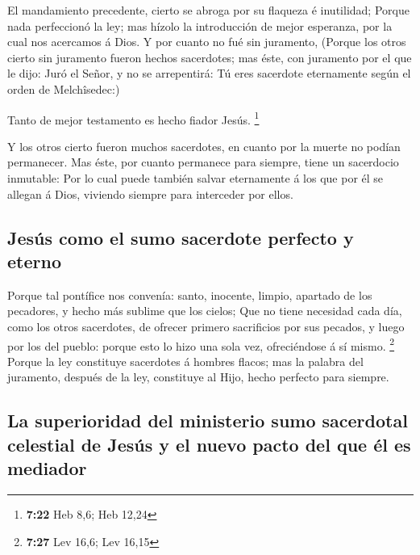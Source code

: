 El mandamiento precedente, cierto se abroga por su
flaqueza é inutilidad;  Porque nada perfeccionó la ley; mas
hízolo la introducción de mejor esperanza, por la cual nos acercamos á
Dios.  Y por cuanto no fué sin juramento, 
(Porque los otros cierto sin juramento fueron hechos sacerdotes; mas
éste, con juramento por el que le dijo: Juró el Señor, y no se
arrepentirá: Tú eres sacerdote eternamente según el orden de
Melchîsedec:)

 Tanto de mejor testamento es hecho fiador Jesús.
\footnote{\textbf{7:22} Heb 8,6; Heb 12,24}

 Y los otros cierto fueron muchos sacerdotes, en cuanto por
la muerte no podían permanecer.  Mas éste, por cuanto
permanece para siempre, tiene un sacerdocio inmutable:  Por
lo cual puede también salvar eternamente á los que por él se allegan á
Dios, viviendo siempre para interceder por ellos.

\hypertarget{jesuxfas-como-el-sumo-sacerdote-perfecto-y-eterno}{%
\subsection{Jesús como el sumo sacerdote perfecto y
eterno}\label{jesuxfas-como-el-sumo-sacerdote-perfecto-y-eterno}}

 Porque tal pontífice nos convenía: santo, inocente,
limpio, apartado de los pecadores, y hecho más sublime que los cielos;
 Que no tiene necesidad cada día, como los otros
sacerdotes, de ofrecer primero sacrificios por sus pecados, y luego por
los del pueblo: porque esto lo hizo una sola vez, ofreciéndose á sí
mismo. \footnote{\textbf{7:27} Lev 16,6; Lev 16,15}  Porque
la ley constituye sacerdotes á hombres flacos; mas la palabra del
juramento, después de la ley, constituye al Hijo, hecho perfecto para
siempre.

\hypertarget{la-superioridad-del-ministerio-sumo-sacerdotal-celestial-de-jesuxfas-y-el-nuevo-pacto-del-que-uxe9l-es-mediador}{%
\subsection{La superioridad del ministerio sumo sacerdotal celestial de
Jesús y el nuevo pacto del que él es
mediador}\label{la-superioridad-del-ministerio-sumo-sacerdotal-celestial-de-jesuxfas-y-el-nuevo-pacto-del-que-uxe9l-es-mediador}}

